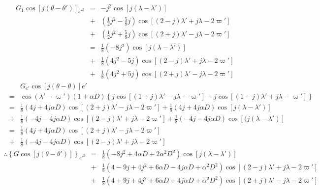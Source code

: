 \documentclass [12pt, a4paper] {article}
\begin{document}
\begin {eqnarray}
    G_1\cos[j(\theta - \theta')]_{e'^2}
    &=&
    -j^2\cos[j(\lambda - \lambda')]
    \\\nonumber 
    &+&
    \left(\frac{1}{2}j^2 - \frac{5}{8}j\right)\cos[(2-j)\lambda' + j\lambda - 2\varpi']
    \\\nonumber 
    &+&
    \left(\frac{1}{2}j^2 + \frac{5}{8}j\right)\cos[(2+j)\lambda' - j\lambda - 2\varpi']
    \\
    &=&
    \frac{1}{8}\left(-8j^2\right)\cos[j(\lambda - \lambda')]
    \\\nonumber 
    &+&
    \frac{1}{8}\left(4j^2 - 5j\right)\cos[(2-j)\lambda' + j\lambda - 2\varpi']
    \\\nonumber 
    &+&
    \frac{1}{8}\left(4j^2 + 5j\right)\cos[(2+j)\lambda' - j\lambda - 2\varpi']
\end {eqnarray}
\begin {eqnarray}
    &\:&
    G_{e'}\cos[j(\theta - \theta)]e'
    \\\nonumber
    &=&
    \cos(\lambda' - \varpi')(1 + \alpha D)
    \left\{
        j\cos[(1 + j)\lambda' - j\lambda - \varpi']
        - 
        j\cos[(1 - j)\lambda' + j\lambda - \varpi']
    \right\}
    \\
    &=& 
    \frac{1}{8}\left(4j + 4j\alpha D\right)
    \cos[(2 + j)\lambda' - j\lambda - 2\varpi']
    +
    \frac{1}{8}\left(4j + 4j\alpha D\right)
    \cos[j(\lambda - \lambda')]
    \\\nonumber 
    &+&
    \frac{1}{8}\left(-4j - 4j\alpha D\right)
    \cos[(2 - j)\lambda' + j\lambda - 2\varpi']
    +
    \frac{1}{8}\left(-4j - 4j\alpha D\right)
    \cos[(j(\lambda - \lambda')]
    \\
    &=&
    \frac{1}{8}\left(4j + 4j\alpha D\right)
    \cos[(2 + j)\lambda' - j\lambda - 2\varpi']
    \\\nonumber 
    &+&
    \frac{1}{8}\left(-4j - 4j\alpha D\right)
    \cos[(2 - j)\lambda' + j\lambda - 2\varpi']
\end {eqnarray}
\begin {eqnarray}
    \therefore
    \left\{G\cos[j(\theta - \theta')]\right\}_{e'^2}
    &=&
    \frac{1}{8}
    \left(
        -8j^2 + 4\alpha D + 2\alpha^2D^2
    \right)
    \cos[j(\lambda - \lambda')]
    \\\nonumber
    &+&
    \frac{1}{8}
    \left(
        4 - 9j + 4j^2 + 6\alpha D - 4j\alpha D + \alpha^2 D^2
    \right)
    \cos[(2-j)\lambda' + j\lambda - 2\varpi']
    \\\nonumber
    &+&
    \frac{1}{8}
    \left(
        4 + 9j + 4j^2 + 6\alpha D + 4j\alpha D + \alpha^2 D^2
    \right)
    \cos[(2+j)\lambda' - j\lambda - 2\varpi']
\end {eqnarray}
\end{document}
